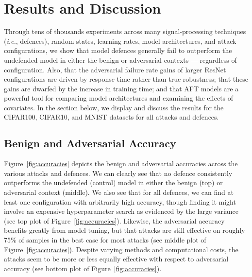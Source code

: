 \section{Results and Discussion}


Through tens of thousands experiments across many signal-processing techniques (\textit{i.e.}, defences), random states, learning rates, model architectures, and attack configurations, we show that model defences generally fail to outperform the undefended model in either the benign or adversarial contexts --- regardless of configuration. Also, that the adversarial failure rate gains of larger ResNet configurations are driven by response time rather than true robustness; that these gains are dwarfed by the increase in training time; and that AFT models are a powerful tool for comparing model architectures and examining the effects of covariates. In the section below, we display and discuss the results for the CIFAR100, CIFAR10, and MNIST datasets for all attacks and defences.

\subsection{Benign and Adversarial Accuracy}
Figure~\ref{fig:accuracies} depicts the benign and adversarial accuracies across the various attacks and defences. We can clearly see that no defence consistently outperforms the undefended (control) model in either the benign (top) or adversarial context (middle). We also see that for all defences, we can find at least one configuration with arbitrarily high accuracy, though finding it might involve an expensive hyperparameter search as evidenced by the large variance (see top plot of Figure~\ref{fig:accuracies}). Likewise, the adversarial accuracy benefits greatly from model tuning, but that attacks are still effective on roughly 75\% of samples in the best case for most attacks (see middle plot of Figure~\ref{fig:accuracies}). Despite varying methods and computational costs, the attacks seem to be more or less equally effective with respect to adversarial accuracy (see bottom plot of Figure~\ref{fig:accuracies}).

